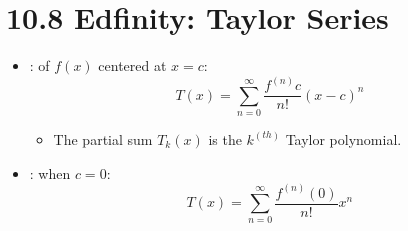 \section{10.8 Edfinity: Taylor Series}
\begin{itemize}
  \item {}: of \(f (x)  \) centered at \(x=c\):
    \[%
    T (x) = \sum_{n=0}^{\infty} \frac{f^{(n)}c}{n!}(x-c)^n
    \]%
    \begin{itemize}
      \item The partial sum \(T_k (x)  \) is the \(k^{(th)} \) Taylor polynomial.
    \end{itemize}

  \item {}: when \(c=0\):
    \[%
    T(x) = \sum_{n=0}^{\infty} \frac{f^{(n)}(0)}{n!}x^n
    \]%




\end{itemize}
